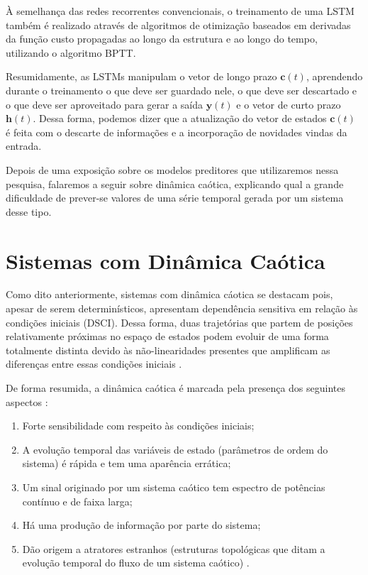 \documentclass[a4paper, 12pt]{article}
\begin{document}
À semelhança das redes recorrentes convencionais, o treinamento de uma LSTM também é realizado através de algoritmos de otimização baseados em derivadas da função custo propagadas ao longo da estrutura e ao longo do tempo, utilizando o algoritmo BPTT.

Resumidamente, as LSTMs manipulam o vetor de longo prazo $\mathbf{c}(t)$, aprendendo durante o treinamento o que deve ser guardado nele, o que deve ser descartado e o que deve ser aproveitado para gerar a saída $\mathbf{y}(t)$ e o vetor de curto prazo $\mathbf{h}(t)$. Dessa forma, podemos dizer que a atualização do vetor de estados $\mathbf{c}(t)$ é feita com o descarte de informações e a incorporação de novidades vindas da entrada.

Depois de uma exposição sobre os modelos preditores que utilizaremos nessa pesquisa, falaremos a seguir sobre dinâmica caótica, explicando qual a grande dificuldade de prever-se valores de uma série temporal gerada por um sistema desse tipo.

\section{Sistemas com Dinâmica Caótica}
Como dito anteriormente, sistemas com dinâmica cáotica se destacam pois, apesar de serem determinísticos, apresentam dependência sensitiva em relação às condições iniciais (DSCI). Dessa forma, duas trajetórias que partem de posições relativamente próximas no espaço de estados podem evoluir de uma forma totalmente distinta devido às não-linearidades presentes que amplificam as diferenças entre essas condições iniciais \cite{fiedler1994caos}.

De forma resumida, a dinâmica caótica é marcada pela presença dos seguintes aspectos \cite{attux2001dinamica}:
\begin{enumerate}
\item Forte sensibilidade com respeito às condições iniciais;
\item A evolução temporal das variáveis de estado (parâmetros de ordem do sistema) é rápida e tem uma aparência errática;
\item Um sinal originado por um sistema caótico tem espectro de potências contínuo e de faixa larga;
\item Há uma produção de informação por parte do sistema;
\item Dão origem a atratores estranhos (estruturas topológicas que ditam a evolução temporal do fluxo de um sistema caótico) \cite{ruelle1971nature}.
\end{enumerate}
\end{document}
